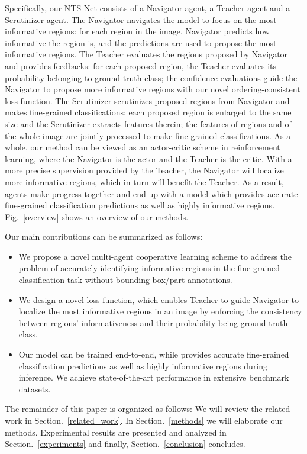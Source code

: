 \documentclass[runningheads]{llncs}
\begin{document}
Specifically, our NTS-Net consists of a Navigator agent, a Teacher agent and a Scrutinizer agent. The Navigator navigates the model to focus on the most informative regions: for each region in the image, Navigator predicts how informative the region is, and the predictions are used to propose the most informative regions. The Teacher evaluates the regions proposed by Navigator and provides feedbacks: for each proposed region, the Teacher evaluates its probability belonging to ground-truth class; the confidence evaluations guide the Navigator to propose more informative regions with our novel ordering-consistent loss function. The Scrutinizer scrutinizes proposed regions from Navigator and makes fine-grained classifications: each proposed region is enlarged to the same size and the Scrutinizer extracts features therein; the features of regions and of the whole image are jointly processed to make fine-grained classifications. As a whole, our method can be viewed as an actor-critic \cite{Konda2002Actor} scheme in reinforcement learning, where the Navigator is the actor and the Teacher is the critic. With a more precise supervision provided by the Teacher, the Navigator will localize more informative regions, which in turn will benefit the Teacher. As a result, agents make progress together and end up with a model which provides accurate fine-grained classification predictions as well as highly informative regions. Fig.~\ref{overview} shows an overview of our methods.

Our main contributions can be summarized as follows:  
\begin{itemize}
\item
We propose a novel multi-agent cooperative learning scheme to address the problem of accurately identifying informative regions in the fine-grained classification task without bounding-box/part annotations.
\item
We design a novel loss function, which enables Teacher to guide Navigator to localize the most informative regions in an image by enforcing the consistency between regions' informativeness and their probability being ground-truth class.

\item
Our model can be trained end-to-end, while provides accurate fine-grained classification predictions as well as highly informative regions during inference.  We achieve state-of-the-art performance in extensive benchmark datasets.
\end{itemize}

The remainder of this paper is organized as follows: We will review the related work in Section.~\ref{related_work}. In Section.~\ref{methods} we will elaborate our methods.  Experimental results are presented and analyzed in Section.~\ref{experiments} and finally, Section.~\ref{conclusion} concludes.
\end{document}
